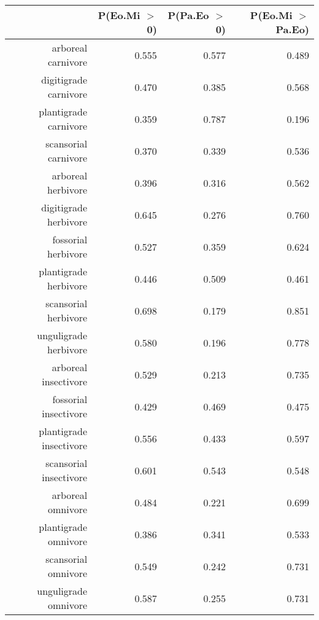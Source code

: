 \begin{table}[ht]
\centering
\begin{tabular}{rrrr}
  \hline
 & P(Eo.Mi $>$ 0) & P(Pa.Eo $>$ 0) & P(Eo.Mi $>$ Pa.Eo) \\ 
  \hline
arboreal carnivore & 0.555 & 0.577 & 0.489 \\ 
  digitigrade carnivore & 0.470 & 0.385 & 0.568 \\ 
  plantigrade carnivore & 0.359 & 0.787 & 0.196 \\ 
  scansorial carnivore & 0.370 & 0.339 & 0.536 \\ 
  arboreal herbivore & 0.396 & 0.316 & 0.562 \\ 
  digitigrade herbivore & 0.645 & 0.276 & 0.760 \\ 
  fossorial herbivore & 0.527 & 0.359 & 0.624 \\ 
  plantigrade herbivore & 0.446 & 0.509 & 0.461 \\ 
  scansorial herbivore & 0.698 & 0.179 & 0.851 \\ 
  unguligrade herbivore & 0.580 & 0.196 & 0.778 \\ 
  arboreal insectivore & 0.529 & 0.213 & 0.735 \\ 
  fossorial insectivore & 0.429 & 0.469 & 0.475 \\ 
  plantigrade insectivore & 0.556 & 0.433 & 0.597 \\ 
  scansorial insectivore & 0.601 & 0.543 & 0.548 \\ 
  arboreal omnivore & 0.484 & 0.221 & 0.699 \\ 
  plantigrade omnivore & 0.386 & 0.341 & 0.533 \\ 
  scansorial omnivore & 0.549 & 0.242 & 0.731 \\ 
  unguligrade omnivore & 0.587 & 0.255 & 0.731 \\ 
   \hline
\end{tabular}
\label{tab:origin_plant}
\end{table}
